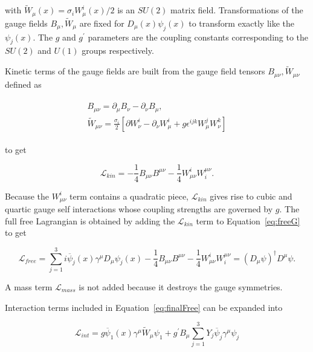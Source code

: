 with $\widetilde{W}_\mu(x) = \sigma_iW_\mu^{i}(x)/2$ is an $SU(2)$ matrix field.  Transformations of the 
gauge fields $B_\mu,\widetilde{W}_\mu$ are fixed for 
$D_\mu(x)\psi_j(x)$ to transform exactly like the $\psi_j(x)$.
The $g$ and $g^{'}$ parameters are the coupling constants corresponding to the $SU(2)$ and 
$U(1)$ groups respectively. 

\par Kinetic terms of the gauge fields are built from the gauge field tensors 
$B_{\mu\nu},\widetilde{W}_{\mu\nu}$ defined as 

\begin{align}
\begin{split}
B_{\mu\nu} = \partial_\mu B_\nu - \partial_\nu B_\mu, \\
\widetilde{W}_{\mu\nu} = \frac{\sigma_i}{2}\left [ \partial W_\nu^i - \partial_\nu W_\mu^i + g\epsilon^{ijk}W_\mu^j W_\nu^k \right ]  
\end{split}
\end{align}

to get 

\begin{equation}
\mathcal{L}_{kin} = -\frac{1}{4}B_{\mu\nu}B^{\mu\nu} - \frac{1}{4}W_{\mu\nu}^iW^{\mu\nu}_i.
\label{eq:lkin}
\end{equation}

Because the $W_{\mu\nu}^i$ term contains a quadratic piece, $\mathcal{L}_{kin}$ gives rise 
to cubic and quartic gauge self interactions whose coupling strengths are governed by $g$.
The full free Lagrangian is obtained by adding the $\mathcal{L}_{kin}$ term to Equation~\ref{eq:freeG} to get 

\begin{equation}
\mathcal{L}_{free} = \sum_{j=1}^{3} i\overline{\psi}_j(x)\gamma^\mu D_\mu\psi_j(x) - \frac{1}{4}B_{\mu\nu}B^{\mu\nu} - \frac{1}{4}W_{\mu\nu}^iW^{\mu\nu}_i = (D_\mu\psi)^\dagger D^\mu\psi.
\label{eq:finalFree}
\end{equation}
 
A mass term $\mathcal{L}_{mass}$ is not added because it destroys the gauge symmetries.

\par Interaction terms included in Equation~\ref{eq:finalFree} can be expanded into   

\begin{equation}
\mathcal{L}_{int} = g\overline{\psi}_1(x)\gamma^\mu\widetilde{W}_\mu\psi_1 + g^{'}B_\mu\sum_{j=1}^{3}Y_j\overline{\psi}_j\gamma^\mu\psi_j
\label{eq:int}
\end{equation}

